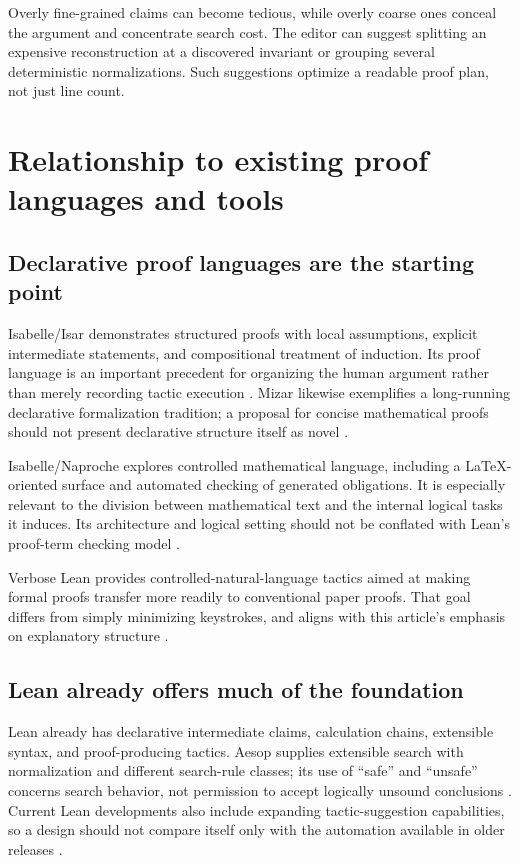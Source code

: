 \documentclass[11pt,a4paper]{article}
\theoremstyle{remark}
\begin{document}
Overly fine-grained claims can become tedious, while overly coarse ones conceal the argument and concentrate search cost. The editor can suggest splitting an expensive reconstruction at a discovered invariant or grouping several deterministic normalizations. Such suggestions optimize a readable proof plan, not just line count.

\section{Relationship to existing proof languages and tools}\label{sec:related}

\subsection{Declarative proof languages are the starting point}

Isabelle/Isar demonstrates structured proofs with local assumptions, explicit intermediate statements, and compositional treatment of induction. Its proof language is an important precedent for organizing the human argument rather than merely recording tactic execution \cite{isar}. Mizar likewise exemplifies a long-running declarative formalization tradition; a proposal for concise mathematical proofs should not present declarative structure itself as novel \cite{mizar}.

Isabelle/Naproche explores controlled mathematical language, including a LaTeX-oriented surface and automated checking of generated obligations. It is especially relevant to the division between mathematical text and the internal logical tasks it induces. Its architecture and logical setting should not be conflated with Lean's proof-term checking model \cite{naproche}.

Verbose Lean provides controlled-natural-language tactics aimed at making formal proofs transfer more readily to conventional paper proofs. That goal differs from simply minimizing keystrokes, and aligns with this article's emphasis on explanatory structure \cite{verbose}.

\subsection{Lean already offers much of the foundation}

Lean already has declarative intermediate claims, calculation chains, extensible syntax, and proof-producing tactics. Aesop supplies extensible search with normalization and different search-rule classes; its use of ``safe'' and ``unsafe'' concerns search behavior, not permission to accept logically unsound conclusions \cite{aesop}. Current Lean developments also include expanding tactic-suggestion capabilities, so a design should not compare itself only with the automation available in older releases \cite{lean-release}.
\end{document}
